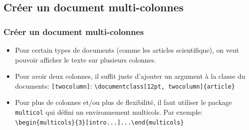 \documentclass{clic_latex_beamer}
\begin{document}
 
   \subsection{Créer un document multi-colonnes}
\begin{frame}
\frametitle{Créer un document multi-colonnes}
    \begin{itemize}
    \item Pour certain types de documents (comme les articles scientifique), on veut pouvoir afficher le texte sur plusieurs colonnes.
    \item Pour avoir deux colonnes, il suffit juste d'ajouter un argument à la classe du documents: \texttt{[twocolumn]}: \texttt{\textbackslash documentclass[12pt, twocolumn]\{article\}}
    \item Pour plus de colonnes et/ou plus de flexibilité, il faut utiliser le package \texttt{multicol} qui défini un environnement multicols. Par exemple: \texttt{ \textbackslash begin\{multicols\}\{3\}[intro...]...\textbackslash end\{multicols\}}
    \end{itemize}
 \end{frame}
 
\end{document}
